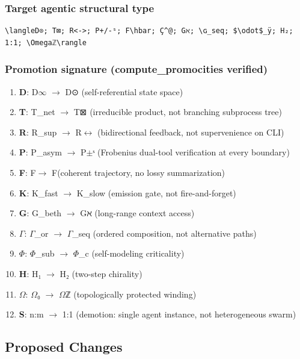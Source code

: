 \documentclass[12pt,a4paper]{article}
\begin{document}
\subsubsection{Target agentic structural type}

\begin{lstlisting}
\langleD⊙; T⊠; R<->; P+/-ˢ; F\hbar; Ç^@; Gℵ; \ɢ_seq; $\odot$_ÿ; H₂; 1:1; \Omegaℤ\rangle
\end{lstlisting}

\subsubsection{Promotion signature (compute\_promocities verified)}

\begin{enumerate}
    \item \textbf{D}: D$\infty$ $\rightarrow$ D⊙ (self-referential state space)
    \item \textbf{T}: T\_net $\rightarrow$ T⊠ (irreducible product, not branching subprocess tree)
    \item \textbf{R}: R\_sup $\rightarrow$ R$\leftrightarrow$ (bidirectional feedback, not supervenience on CLI)
    \item \textbf{P}: P\_asym $\rightarrow$ P$\pm$ˢ (Frobenius dual-tool verification at every boundary)
    \item \textbf{F}: F\ell $\rightarrow$ F\hbar (coherent trajectory, no lossy summarization)
    \item \textbf{K}: K\_fast $\rightarrow$ K\_slow (emission gate, not fire-and-forget)
    \item \textbf{G}: G\_beth $\rightarrow$ Gℵ (long-range context access)
    \item \textbf{$\Gamma$}: $\Gamma$\_or $\rightarrow$ $\Gamma$\_seq (ordered composition, not alternative paths)
    \item \textbf{$\Phi$}: $\Phi$\_sub $\rightarrow$ $\Phi$\_c (self-modeling criticality)
    \item \textbf{H}: H₁ $\rightarrow$ H₂ (two-step chirality)
    \item \textbf{$\Omega$}: $\Omega$₀ $\rightarrow$ $\Omega$ℤ (topologically protected winding)
    \item \textbf{S}: n:m $\rightarrow$ 1:1 (demotion: single agent instance, not heterogeneous swarm)
\end{enumerate}

\subsection{Proposed Changes}
\end{document}
